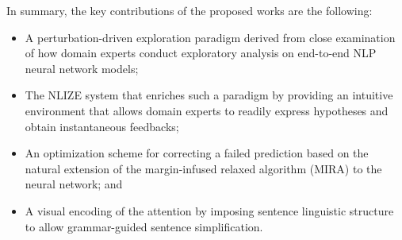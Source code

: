 In summary, the key contributions of the proposed works are the following:
\begin{itemize}
    \item A perturbation-driven exploration paradigm derived from close examination of how domain experts conduct exploratory analysis on end-to-end NLP neural network models;
    
    \item The NLIZE system that enriches such a paradigm by providing an intuitive environment that allows domain experts to readily express hypotheses and obtain instantaneous feedbacks; 

    \item An optimization scheme for correcting a failed prediction based on the natural extension of the margin-infused relaxed algorithm (MIRA) to the neural network; and
    
    \item A visual encoding of the attention by imposing sentence linguistic structure to allow grammar-guided sentence simplification.
\end{itemize}
%





